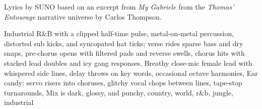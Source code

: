 
\begin{notes}
Lyrics by SUNO based on an excerpt from \emph{My Gabriele} from the \emph{Thomas’ Entourage} narrative universe by Carlos Thompson.
\end{notes}
\begin{style}
Industrial R\&B with a clipped half-time pulse, metal-on-metal percussion, distorted sub kicks, and syncopated hat ticks; verse rides sparse bass and dry snaps, pre-chorus opens with filtered pads and reverse swells, chorus hits with stacked lead doubles and icy gang responses, Breathy close-mic female lead with whispered side lines, delay throws on key words, occasional octave harmonies, Ear candy: servo risers into choruses, glitchy vocal chops between lines, tape-stop turnarounds, Mix is dark, glossy, and punchy, country, world, r\&b, jungle, industrial
\end{style}
